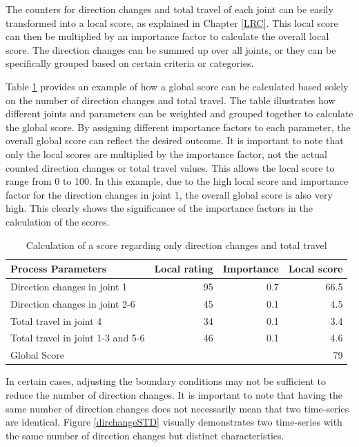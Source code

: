 The counters for direction changes and total travel of each joint can be easily transformed into a local score, as explained in Chapter \ref{LRC}. This local score can then be multiplied by an importance factor to calculate the overall local score. The direction changes can be summed up over all joints, or they can be specifically grouped based on certain criteria or categories.  

Table \ref{exampleDirTravel} provides an example of how a global score can be calculated based solely on the number of direction changes and total travel. The table illustrates how different joints and parameters can be weighted and grouped together to calculate the global score. By assigning different importance factors to each parameter, the overall global score can reflect the desired outcome. It is important to note that only the local scores are multiplied by the importance factor, not the actual counted direction changes or total travel values. This allows the local score to range from 0 to 100. In this example, due to the high local score and importance factor for the direction changes in joint 1, the overall global score is also very high. This clearly shows the significance of the importance factors in the calculation of the scores.

\begin{table}[H]
	\centering
	\begin{tabular}{||l|r|r|r||}
		Process Parameters & Local rating & Importance & Local score\\
		\hline
		\hline
		\hline
		
		Direction changes in joint 1 & 95 & 0.7 & 66.5\\
		Direction changes in joint 2-6 & 45& 0.1&4.5\\
		Total travel in joint 4& 34& 0.1&3.4\\
		Total travel in joint 1-3 and 5-6& 46&0.1&4.6\\
		\hline
		\hline
		\hline
		Global Score& & &79\\
		\hline
		\hline
	\end{tabular}
	
	\caption{Calculation of a score regarding only direction changes and total travel}
	\label{exampleDirTravel}
\end{table}

\newpage
In certain cases, adjusting the boundary conditions may not be sufficient to reduce the number of direction changes. It is important to note that having the same number of direction changes does not necessarily mean that two time-series are identical. Figure \ref{dirchangeSTD} visually demonstrates two time-series with the same number of direction changes but distinct characteristics.

